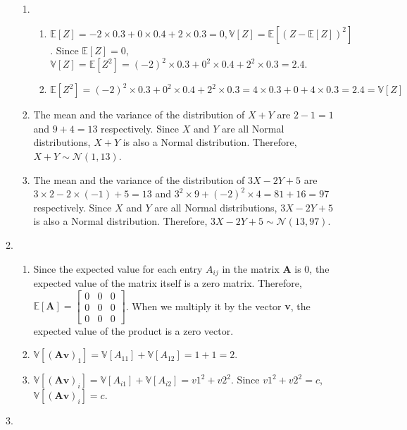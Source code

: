 \documentclass{article}
\begin{document}
\begin{enumerate}
\begin{enumerate}
\begin{enumerate}
          \item
            \begin{enumerate}
              \item $\mathbb{E}[Z]=-2\times 0.3 + 0 \times 0.4 + 2 \times 0.3 = 0, \mathbb{V}[Z] = \mathbb{E}[(Z-\mathbb{E}[Z])^2]$. Since $\mathbb{E}[Z]=0$, $\mathbb{V}[Z] = \mathbb{E}[Z^2] = (-2)^2 \times 0.3 + 0^2 \times 0.4 + 2^2 \times 0.3 = 2.4$.
              \item $\mathbb{E}[Z^2] = (-2)^2 \times 0.3 + 0^2 \times 0.4 + 2^2 \times 0.3 = 4 \times 0.3 + 0 + 4 \times 0.3 = 2.4 = \mathbb{V}[Z]$
            \end{enumerate}
          \item The mean and the variance of the distribution of $X+Y$ are $2-1=1$ and $9+4=13$ respectively. Since $X$ and $Y$ are all Normal distributions, $X+Y$ is also a Normal distribution. Therefore, $X+Y \sim \mathcal{N}(1, 13)$.
          \item The mean and the variance of the distribution of $3X-2Y+5$ are $3\times 2 - 2 \times (-1) + 5 = 13$ and $3^2 \times 9 + (-2)^2 \times 4 = 81 + 16 = 97$ respectively. Since $X$ and $Y$ are all Normal distributions, $3X-2Y+5$ is also a Normal distribution. Therefore, $3X-2Y+5 \sim \mathcal{N}(13, 97)$.
        \end{enumerate}
      \item
        \begin{enumerate}
          \item Since the expected value for each entry $A_{ij}$ in the matrix $\mathbf{A}$ is 0, the expected value of the matrix itself is a zero matrix. Therefore, $\mathbb{E}[\mathbf{A}] =
            \begin{bmatrix}
              0 & 0 & 0 \\
              0 & 0 & 0 \\
              0 & 0 & 0
            \end{bmatrix}$. When we multiply it by the vector $\mathbf{v}$, the expected value of the product is a zero vector.
          \item $\mathbb{V}[(\mathbf{Av})_1] = \mathbb{V}[A_{11}] + \mathbb{V}[A_{12}] = 1 + 1 = 2$.
          \item $\mathbb{V}[(\mathbf{Av})_i] = \mathbb{V}[A_{i1}] + \mathbb{V}[A_{i2}] = v1^2 + v2^2$. Since $v1^2 + v2^2 = c$, $\mathbb{V}[(\mathbf{Av})_i] = c$.
        \end{enumerate}
      \item
        \begin{enumerate}

\end{enumerate}
\end{enumerate}
\end{enumerate}
\end{document}
